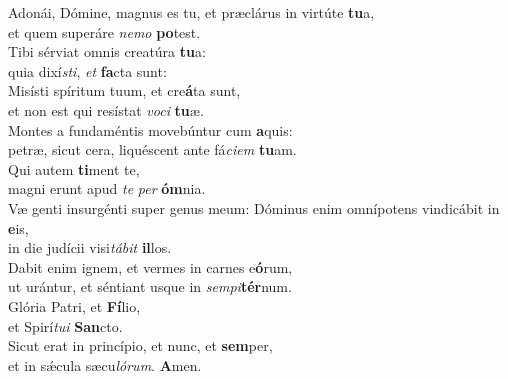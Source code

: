 \evenverse Adonái, Dómine, magnus es tu, et præclárus in virtúte \textbf{tu}a,~\*\\
\evenverse et quem superáre \textit{ne}\textit{mo} \textbf{po}test.\\
\oddverse Tibi sérviat omnis creatúra \textbf{tu}a:~\*\\
\oddverse quia dixí\textit{sti}, \textit{et} \textbf{fa}cta sunt:\\
\evenverse Misísti spíritum tuum, et cre\textbf{á}ta sunt,~\*\\
\evenverse et non est qui resístat \textit{vo}\textit{ci} \textbf{tu}æ.\\
\oddverse Montes a fundaméntis movebúntur cum \textbf{a}quis:~\*\\
\oddverse petræ, sicut cera, liquéscent ante fá\textit{ci}\textit{em} \textbf{tu}am.\\
\evenverse Qui autem \textbf{ti}ment te,~\*\\
\evenverse magni erunt apud \textit{te} \textit{per} \textbf{óm}nia.\\
\oddverse Væ genti insurgénti super genus meum: Dóminus enim omnípotens vindicábit in \textbf{e}is,~\*\\
\oddverse in die judícii visi\textit{tá}\textit{bit} \textbf{il}los.\\
\evenverse Dabit enim ignem, et vermes in carnes e\textbf{ó}rum,~\*\\
\evenverse ut urántur, et séntiant usque in \textit{sem}\textit{pi}\textbf{tér}num.\\
\oddverse Glória Patri, et \textbf{Fí}lio,~\*\\
\oddverse et Spirí\textit{tu}\textit{i} \textbf{San}cto.\\
\evenverse Sicut erat in princípio, et nunc, et \textbf{sem}per,~\*\\
\evenverse et in sǽcula sæcu\textit{ló}\textit{rum}. \textbf{A}men.\\
